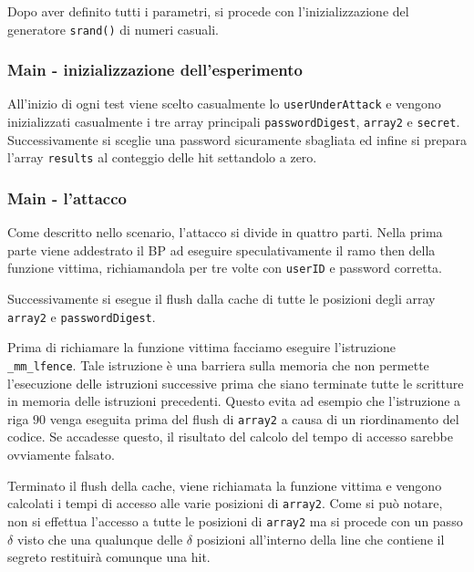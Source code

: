 				Dopo aver definito tutti i parametri, si procede con l'inizializzazione del generatore \texttt{srand()} di numeri casuali.
				
				\subsubsection{Main - inizializzazione dell'esperimento}
				
				All'inizio di ogni test viene scelto casualmente lo \texttt{userUnderAttack} e vengono inizializzati casualmente i tre array principali \texttt{passwordDigest}, \texttt{array2} e \texttt{secret}. Successivamente si sceglie una password sicuramente sbagliata ed infine si prepara l'array \texttt{results} al conteggio delle hit settandolo a zero.
				
				\subsubsection{Main - l'attacco}
				
				Come descritto nello scenario, l'attacco si divide in quattro parti. Nella prima parte viene addestrato il \ac{BP} ad eseguire speculativamente il ramo then della funzione vittima, richiamandola per tre volte con \texttt{userID} e password corretta.
				
				Successivamente si esegue il flush dalla cache di tutte le posizioni degli array \texttt{array2} e \texttt{passwordDigest}.
				
				Prima di richiamare la funzione vittima facciamo eseguire l'istruzione \texttt{\_mm\_lfence}. Tale istruzione è una barriera sulla memoria che non permette l'esecuzione delle istruzioni successive prima che siano terminate tutte le scritture in memoria delle istruzioni precedenti. Questo evita ad esempio che l'istruzione a riga $90$ venga eseguita prima del flush di \texttt{array2} a causa di un riordinamento del codice. Se accadesse questo, il risultato del calcolo del tempo di accesso sarebbe ovviamente falsato.
				
				Terminato il flush della cache, viene richiamata la funzione vittima e vengono calcolati i tempi di accesso alle varie posizioni di \texttt{array2}. Come si può notare, non si effettua l'accesso a tutte le posizioni di \texttt{array2} ma si procede con un passo $\delta$ visto che una qualunque delle $\delta$ posizioni all'interno della line che contiene il segreto restituirà comunque una hit.
				
